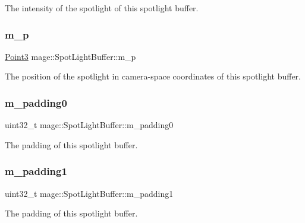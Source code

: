 The intensity of the spotlight of this spotlight buffer. \hypertarget{structmage_1_1_spot_light_buffer_a6cb32b6089b90aa937df99bb794884e3}{}\label{structmage_1_1_spot_light_buffer_a6cb32b6089b90aa937df99bb794884e3} 
\subsubsection{\texorpdfstring{m\+\_\+p}{m\_p}}
{\footnotesize\ttfamily \hyperlink{structmage_1_1_point3}{Point3} mage\+::\+Spot\+Light\+Buffer\+::m\+\_\+p}

The position of the spotlight in camera-\/space coordinates of this spotlight buffer. \hypertarget{structmage_1_1_spot_light_buffer_a8a5110d1427ca192cee7751ae8aeabab}{}\label{structmage_1_1_spot_light_buffer_a8a5110d1427ca192cee7751ae8aeabab} 
\subsubsection{\texorpdfstring{m\+\_\+padding0}{m\_padding0}}
{\footnotesize\ttfamily uint32\+\_\+t mage\+::\+Spot\+Light\+Buffer\+::m\+\_\+padding0}

The padding of this spotlight buffer. \hypertarget{structmage_1_1_spot_light_buffer_a60369775901f4536a28cc35ab2275bd8}{}\label{structmage_1_1_spot_light_buffer_a60369775901f4536a28cc35ab2275bd8} 
\subsubsection{\texorpdfstring{m\+\_\+padding1}{m\_padding1}}
{\footnotesize\ttfamily uint32\+\_\+t mage\+::\+Spot\+Light\+Buffer\+::m\+\_\+padding1}

The padding of this spotlight buffer. 